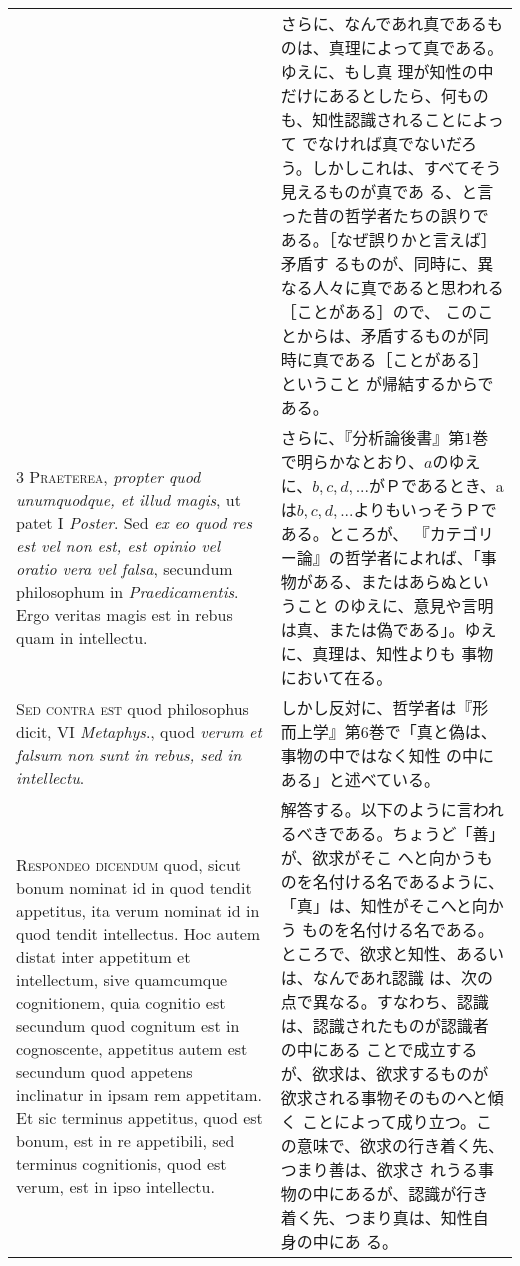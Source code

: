 \documentclass[10pt]{jsarticle} %
\begin{document}
\begin{longtable}{p{21em}p{21em}}
&

さらに、なんであれ真であるものは、真理によって真である。ゆえに、もし真
 理が知性の中だけにあるとしたら、何ものも、知性認識されることによって
 でなければ真でないだろう。しかしこれは、すべてそう見えるものが真であ
 る、と言った昔の哲学者たちの誤りである。［なぜ誤りかと言えば］矛盾す
 るものが、同時に、異なる人々に真であると思われる［ことがある］ので、
 このことからは、矛盾するものが同時に真である［ことがある］ということ
 が帰結するからである。

\\


{\scshape 3 Praeterea}, {\itshape propter quod unumquodque, et illud
magis}, ut patet I {\itshape Poster}. Sed {\itshape ex eo quod res est
vel non est, est opinio vel oratio vera vel falsa}, secundum
philosophum in {\itshape Praedicamentis}. Ergo veritas magis est in
rebus quam in intellectu.


&

さらに、『分析論後書』第1巻で明らかなとおり、$a$のゆえに、$b, c, d,
...$がＰであるとき、aは$b, c, d, ...$よりもいっそうＰである。ところが、
『カテゴリー論』の哲学者によれば、「事物がある、またはあらぬということ
のゆえに、意見や言明は真、または偽である」。ゆえに、真理は、知性よりも
事物において在る。

\\


{\scshape Sed contra est} quod philosophus dicit, VI {\itshape
Metaphys}., quod {\itshape verum et falsum non sunt in rebus, sed in
intellectu}.


&

 しかし反対に、哲学者は『形而上学』第6巻で「真と偽は、事物の中ではなく知性
 の中にある」と述べている。


\\


{\scshape Respondeo dicendum} quod, sicut bonum nominat id in quod
tendit appetitus, ita verum nominat id in quod tendit intellectus. Hoc
autem distat inter appetitum et intellectum, sive quamcumque
cognitionem, quia cognitio est secundum quod cognitum est in
cognoscente, appetitus autem est secundum quod appetens inclinatur in
ipsam rem appetitam. Et sic terminus appetitus, quod est bonum, est in
re appetibili, sed terminus cognitionis, quod est verum, est in ipso
intellectu.


&

解答する。以下のように言われるべきである。ちょうど「善」が、欲求がそこ
へと向かうものを名付ける名であるように、「真」は、知性がそこへと向かう
ものを名付ける名である。ところで、欲求と知性、あるいは、なんであれ認識
は、次の点で異なる。すなわち、認識は、認識されたものが認識者の中にある
ことで成立するが、欲求は、欲求するものが欲求される事物そのものへと傾く
ことによって成り立つ。この意味で、欲求の行き着く先、つまり善は、欲求さ
れうる事物の中にあるが、認識が行き着く先、つまり真は、知性自身の中にあ
る。


\end{longtable}
\end{document}
